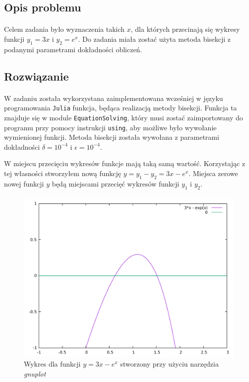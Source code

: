 \documentclass[a4paper]{article}
\begin{document}
\subsection{Opis problemu}
\paragraph{}
Celem zadania było wyznaczenia takich $x$, dla których przecinają się wykresy funkcji $y_{1} = 3x$ i $y_{2} = e^x$. Do zadania miała zostać użyta metoda bisekcji z podanymi parametrami dokładności obliczeń.

\subsection{Rozwiązanie}
\paragraph{}
W zadaniu została wykorzystana zaimplementowana wcześniej w języku programowania \texttt{Julia} funkcja, będąca realizacją metody bisekcji. Funkcja ta znajduje się w module \texttt{EquationSolving}, który musi zostać zaimportowany do programu przy pomocy instrukcji \texttt{using}, aby możliwe było wywołanie wymienionej funkcji. Metoda bisekcji została wywołana z parametrami dokładności $\delta = 10^{-4}$ i $\epsilon = 10^{-4}$.

W miejscu przecięciu wykresów funkcje mają taką samą wartość. Korzystając z tej własności stworzyłem nową funkcję $y = y_{1} - y_{2} = 3x - e^x$. Miejsca zerowe nowej funkcji $y$ będą miejscami przecięć wykresów funkcji $y_{1}$ i $y_{2}$.

\paragraph{}
\begin{figure}[htbp]
  \centering
  \includegraphics[scale=0.35]{wykres.pdf}
  \caption{Wykres dla funkcji $y = 3x - e^x$ stworzony przy użyciu narzędzia \textit{gnuplot}}
\end{figure}
\end{document}
